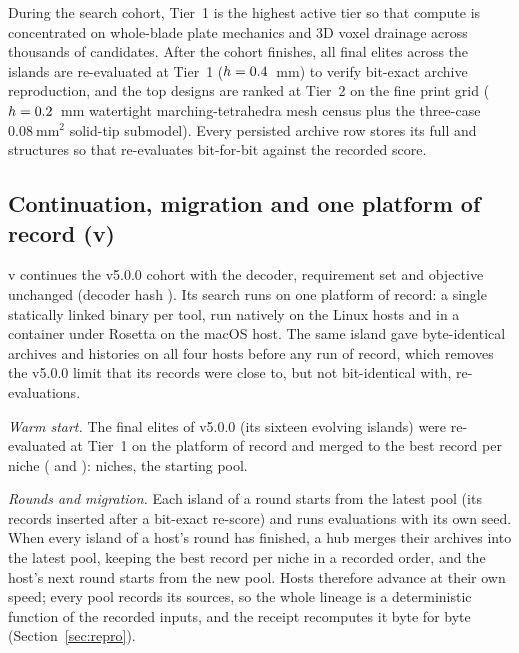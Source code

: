 During the search cohort, Tier~1 is the highest active tier so that compute is concentrated on whole-blade plate mechanics and
3D voxel drainage across thousands of candidates. After the cohort finishes, all \gCohortElites{} final elites across the
islands are re-evaluated at Tier~1 ($h = 0.4$~mm) to verify bit-exact archive reproduction, and the top \gShortlist{} designs
are ranked at Tier~2 on the fine print grid ($h = 0.2$~mm watertight marching-tetrahedra mesh census plus the three-case
$0.08~\mathrm{mm^2}$  solid-tip submodel). Every persisted archive row stores its full  and
 structures so that  re-evaluates 
bit-for-bit against the recorded score.

\subsection{Continuation, migration and one platform of record (v\gRecord)}\label{sec:continuation}
v\gRecord{} continues the v5.0.0 cohort with the decoder, requirement set and objective unchanged (decoder hash \gDecoder). Its
search runs on one platform of record: a single statically linked  binary per tool, run natively on the Linux hosts
and in a  container under Rosetta on the macOS host. The same island gave byte-identical archives and histories
on all four hosts before any run of record, which removes the v5.0.0 limit that its  records were close to, but not
bit-identical with,  re-evaluations.

\emph{Warm start.} The \gVFiveElites{} final elites of v5.0.0 (its sixteen evolving islands) were re-evaluated at Tier~1 on the
platform of record and merged to the best record per niche (
 and ): \gPoolZeroNiches{} niches, the starting pool.

\emph{Rounds and migration.} Each island of a round starts from the latest pool (its records inserted after a bit-exact
re-score) and runs \gEvalsIsland{} evaluations with its own seed. When every island of a host's round has finished, a hub merges
their archives into the latest pool, keeping the best record per niche in a recorded order, and the host's next round starts from
the new pool. Hosts therefore advance at their own speed; every pool records its sources, so the whole lineage is a deterministic
function of the recorded inputs, and the receipt recomputes it byte for byte (Section~\ref{sec:repro}).

